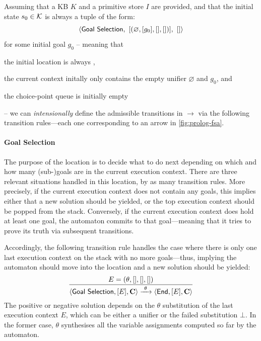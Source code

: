 \documentclass[12pt,a4paper,openright,twoside]{book}
\begin{document}
Assuming that a KB $K$ and a primitive store $I$ are provided, and that the initial state $s_0 \in \mathcal{K}$ is always a tuple of the form:
%
\[ \langle \textsf{Goal Selection},\   [( \varnothing, [g_0], [], [] )],\  [] \rangle \]
%
for some initial goal $g_0$ -- meaning that
%
\begin{inlinelist}
    \item the initial location is always ,
    \item the current context initally only contains the empty unifier $\varnothing$ and $g_0$, and
    \item the choice-point queue is initially empty
\end{inlinelist}
%
-- we can \emph{intensionally} define the admissible transitions in $\longrightarrow$ via the following transition rules---each one corresponding to an arrow in \cref{fig:prolog-fsa}.

\paragraph{Goal Selection}

The purpose of the  location is to decide what to do next depending on which and how many (sub-)goals are in the current execution context.
%
There are three relevant situations handled in this location, by as many transition rules.
%
More precisely, if the current execution context does not contain any goals, this implies either that a new solution should be yielded, or the top execution context should be popped from the stack.
%
Conversely, if the current execution context does hold at least one goal, the automaton commits to that goal---meaning that it tries to prove its truth via subsequent transitions.

Accordingly, the following transition rule handles the case where there is only one last execution context on the stack with no more goals---thus, implying the automaton should move into the  location and a new solution should be yielded:
%
\[
\frac{
    E = (\theta, [], [], [])
}{
    \langle \textsf{Goal Selection}, [E], \mathbf{C} \rangle
    \xrightarrow{\ \theta\ }
    \langle \textsf{End}, [E], \mathbf{C} \rangle
}
\]
The positive or negative solution depends on the $\theta$ substitution of the last execution context $E$, which can be either a unifier or the failed substitution $\bot$.
In the former case, $\theta$ synthesises all the variable assignments computed so far by the automaton.
\end{document}
